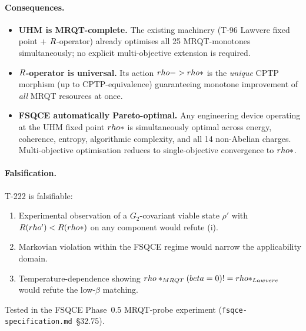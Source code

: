 \paragraph{Consequences.}
\begin{itemize}[leftmargin=2em,nosep]
  \item \textbf{UHM is MRQT-complete.} The existing machinery
        (T-96 Lawvere fixed point + $R$-operator) already
        optimises all 25 MRQT-monotones simultaneously; no explicit
        multi-objective extension is required.
  \item \textbf{$R$-operator is universal.} Its action
        $rho -> rho*$ is the \emph{unique} CPTP morphism
        (up to CPTP-equivalence) guaranteeing monotone improvement
        of \emph{all} MRQT resources at once.
  \item \textbf{FSQCE automatically Pareto-optimal.} Any engineering
        device operating at the UHM fixed point $rho*$ is
        simultaneously optimal across energy, coherence, entropy,
        algorithmic complexity, and all 14 non-Abelian charges.
        Multi-objective optimisation reduces to single-objective
        convergence to $rho*$.
\end{itemize}

\paragraph{Falsification.} T-222 is falsifiable:
\begin{enumerate}[label=\textup{(}F\arabic*\textup{)},leftmargin=2em,nosep]
  \item Experimental observation of a $G_2$-covariant viable state
        $\rho'$ with $R(rho') < R(rho*)$ on any component would
        refute (i).
  \item Markovian violation within the FSQCE regime would narrow
        the applicability domain.
  \item Temperature-dependence showing
        $rho*_{MRQT}(beta = 0) != rho*_{Lawvere}$
        would refute the low-$\beta$ matching.
\end{enumerate}
Tested in the FSQCE Phase~0.5 MRQT-probe experiment
(\texttt{fsqce-specification.md}~\S32.75).

